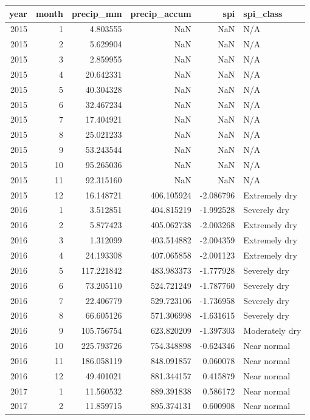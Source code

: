 \begin{tabular}{rrrrrl}
\toprule
year & month & precip\_mm & precip\_accum & spi & spi\_class \\
\midrule
2015 & 1 & 4.803555 & NaN & NaN & N/A \\
2015 & 2 & 5.629904 & NaN & NaN & N/A \\
2015 & 3 & 2.859955 & NaN & NaN & N/A \\
2015 & 4 & 20.642331 & NaN & NaN & N/A \\
2015 & 5 & 40.304328 & NaN & NaN & N/A \\
2015 & 6 & 32.467234 & NaN & NaN & N/A \\
2015 & 7 & 17.404921 & NaN & NaN & N/A \\
2015 & 8 & 25.021233 & NaN & NaN & N/A \\
2015 & 9 & 53.243544 & NaN & NaN & N/A \\
2015 & 10 & 95.265036 & NaN & NaN & N/A \\
2015 & 11 & 92.315160 & NaN & NaN & N/A \\
2015 & 12 & 16.148721 & 406.105924 & -2.086796 & Extremely dry \\
2016 & 1 & 3.512851 & 404.815219 & -1.992528 & Severely dry \\
2016 & 2 & 5.877423 & 405.062738 & -2.003268 & Extremely dry \\
2016 & 3 & 1.312099 & 403.514882 & -2.004359 & Extremely dry \\
2016 & 4 & 24.193308 & 407.065858 & -2.001123 & Extremely dry \\
2016 & 5 & 117.221842 & 483.983373 & -1.777928 & Severely dry \\
2016 & 6 & 73.205110 & 524.721249 & -1.787760 & Severely dry \\
2016 & 7 & 22.406779 & 529.723106 & -1.736958 & Severely dry \\
2016 & 8 & 66.605126 & 571.306998 & -1.631615 & Severely dry \\
2016 & 9 & 105.756754 & 623.820209 & -1.397303 & Moderately dry \\
2016 & 10 & 225.793726 & 754.348898 & -0.624346 & Near normal \\
2016 & 11 & 186.058119 & 848.091857 & 0.060078 & Near normal \\
2016 & 12 & 49.401021 & 881.344157 & 0.415879 & Near normal \\
2017 & 1 & 11.560532 & 889.391838 & 0.586172 & Near normal \\
2017 & 2 & 11.859715 & 895.374131 & 0.600908 & Near normal \\

\end{tabular}
